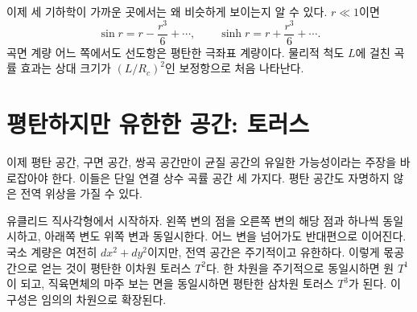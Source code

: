 \begin{classroomqa}\end{classroomqa}

이제 세 기하학이 가까운 곳에서는 왜 비슷하게 보이는지 알 수 있다. \(r\ll1\)이면
\begin{equation}
\sin r=r-\frac{r^3}{6}+\cdots,
\qquad
\sinh r=r+\frac{r^3}{6}+\cdots.
\end{equation}
곡면 계량 어느 쪽에서도 선도항은 평탄한 극좌표 계량이다. 물리적 척도 \(L\)에 걸친 곡률 효과는 상대 크기가 \((L/R_c)^2\)인 보정항으로 처음 나타난다.

\begin{classroomqa}\end{classroomqa}

\section{평탄하지만 유한한 공간: 토러스}

이제 평탄 공간, 구면 공간, 쌍곡 공간만이 균질 공간의 유일한 가능성이라는 주장을 바로잡아야 한다. 이들은 단일 연결 상수 곡률 공간 세 가지다. 평탄 공간도 자명하지 않은 전역 위상을 가질 수 있다.

유클리드 직사각형에서 시작하자. 왼쪽 변의 점을 오른쪽 변의 해당 점과 하나씩 동일시하고, 아래쪽 변도 위쪽 변과 동일시한다. 어느 변을 넘어가도 반대편으로 이어진다. 국소 계량은 여전히 \(dx^2+dy^2\)이지만, 전역 공간은 주기적이고 유한하다. 이렇게 몫공간으로 얻는 것이 평탄한 이차원 토러스 \(T^2\)다. 한 차원을 주기적으로 동일시하면 원 \(T^1\)이 되고, 직육면체의 마주 보는 면을 동일시하면 평탄한 삼차원 토러스 \(T^3\)가 된다. 이 구성은 임의의 차원으로 확장된다.

